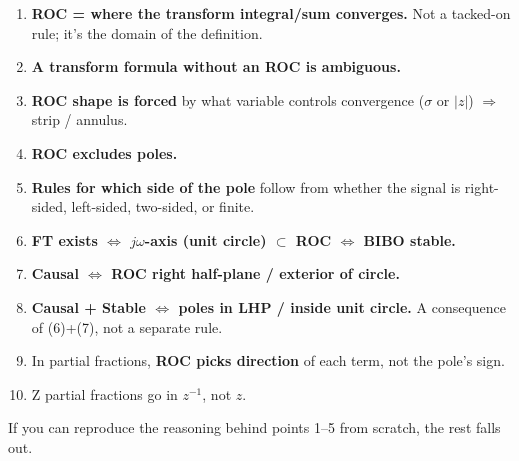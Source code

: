 \documentclass[11pt]{article}
\begin{document}
\begin{enumerate}
  \item \textbf{ROC = where the transform integral/sum converges.} Not a tacked-on rule; it's the domain of the definition.
  \item \textbf{A transform formula without an ROC is ambiguous.}
  \item \textbf{ROC shape is forced} by what variable controls convergence ($\sigma$ or $|z|$) $\Rightarrow$ strip / annulus.
  \item \textbf{ROC excludes poles.}
  \item \textbf{Rules for which side of the pole} follow from whether the signal is right-sided, left-sided, two-sided, or finite.
  \item \textbf{FT exists $\iff$ $j\omega$-axis (unit circle) $\subset$ ROC $\iff$ BIBO stable.}
  \item \textbf{Causal $\iff$ ROC right half-plane / exterior of circle.}
  \item \textbf{Causal + Stable $\iff$ poles in LHP / inside unit circle.} A consequence of (6)+(7), not a separate rule.
  \item In partial fractions, \textbf{ROC picks direction} of each term, not the pole's sign.
  \item Z partial fractions go in $z^{-1}$, not $z$.
\end{enumerate}

If you can reproduce the reasoning behind points 1--5 from scratch, the rest falls out.
\end{document}
